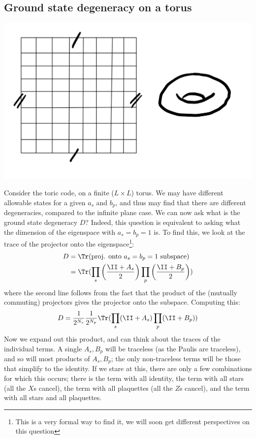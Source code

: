 \subsection{Ground state degeneracy on a torus}
\begin{center}
    \includegraphics[scale=0.4]{Lectures/Images/lec2-torus.png}
\end{center}
Consider the toric code, on a finite ($L \times L$) torus. We may have different allowable states for a given $a_s$ and $b_p$, and thus may find that there are different degeneracies, compared to the infinite plane case.  We can now ask what is the ground state degeneracy $D$? Indeed, this question is equivalent to asking what the dimension of the eigenspace with $a_s = b_p = 1$ is. To find this, we look at the trace of the projector onto the eigenspace\footnote{This is a very formal way to find it, we will soon get different perspectives on this question}:
\begin{equation}
    \begin{split}
        D &= \Tr(\text{proj. onto $a_s = b_p = 1$ subspace})
        \\ &= \Tr(\prod_{s}\left(\frac{\II + A_s}{2}\right)\prod_{p}\left(\frac{\II + B_p}{2}\right))
    \end{split}
\end{equation}
where the second line follows from the fact that the product of the (mutually commuting) projectors gives the projector onto the subspace. Computing this:
\begin{equation}
    D = \frac{1}{2^{N_s}}\frac{1}{2^{N_p}}\Tr(\prod_{s}(\II + A_s)\prod_{p}(\II + B_p))
\end{equation}
Now we expand out this product, and can think about the traces of the individual terms. A single $A_s, B_p$ will be traceless (as the Paulis are traceless), and so will most products of $A_s, B_p$; the only non-traceless terms will be those that simplify to the identity. If we stare at this, there are only a few combinations for which this occurs; there is the term with all identity, the term with all stars (all the $X$s cancel), the term with all plaquettes (all the $Z$s cancel), and the term with all stars and all plaquettes.
